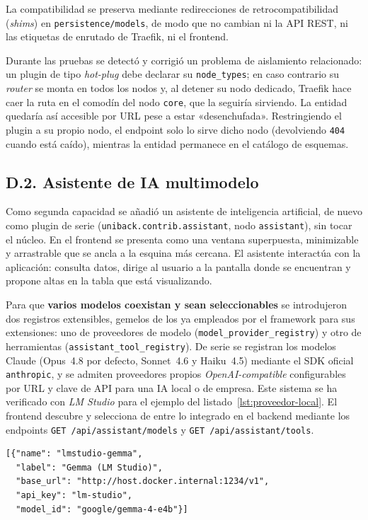 La compatibilidad se preserva mediante redirecciones de retrocompatibilidad
(\emph{shims}) en \texttt{persistence/models}, de modo que no cambian ni la API
REST, ni las etiquetas de enrutado de Traefik, ni el frontend.

Durante las pruebas se detectó y corrigió un problema de aislamiento
relacionado: un plugin de tipo \emph{hot-plug} debe declarar su
\texttt{node\_types}; en caso contrario su \emph{router} se monta en todos los
nodos y, al detener su nodo dedicado, Traefik hace caer la ruta en el comodín
del nodo \texttt{core}, que la seguiría sirviendo. La entidad quedaría así
accesible por URL pese a estar «desenchufada». Restringiendo el plugin a su
propio nodo, el endpoint solo lo sirve dicho nodo (devolviendo \texttt{404}
cuando está caído), mientras la entidad permanece en el catálogo de esquemas.

\subsection{D.2. Asistente de IA multimodelo}
\label{anexo:ia}
Como segunda capacidad se añadió un asistente de inteligencia artificial, de
nuevo como plugin de serie (\texttt{uniback.contrib.assistant}, nodo
\texttt{assistant}), sin tocar el núcleo. En el frontend se presenta como una
ventana superpuesta, minimizable y arrastrable que se ancla a la esquina más
cercana. El asistente interactúa con la aplicación: consulta datos, dirige al
usuario a la pantalla donde se encuentran y propone altas en la tabla que está
visualizando.

Para que \textbf{varios modelos coexistan y sean seleccionables} se
introdujeron dos registros extensibles, gemelos de los ya empleados por el
framework para sus extensiones: uno de proveedores de modelo
(\texttt{model\_provider\_registry}) y otro de herramientas
(\texttt{assistant\_\allowbreak tool\_registry}). De serie se registran los modelos Claude
(Opus~4.8 por defecto, Sonnet~4.6 y Haiku~4.5) mediante el SDK oficial
\texttt{anthropic}, y se admiten proveedores propios \emph{OpenAI-compatible}
configurables por URL y clave de API para una IA local o de empresa. Este sistema se ha 
verificado con \emph{LM Studio} para el ejemplo del
listado~\ref{lst:proveedor-local}. El frontend descubre y selecciona de entre
lo integrado en el backend mediante los endpoints
\texttt{GET /api/assistant/models} y \texttt{GET /api/assistant/tools}.

\begin{lstlisting}[caption={Proveedor de modelo local configurado por variable de entorno.}, label={lst:proveedor-local}]
[{"name": "lmstudio-gemma",
  "label": "Gemma (LM Studio)",
  "base_url": "http://host.docker.internal:1234/v1",
  "api_key": "lm-studio",
  "model_id": "google/gemma-4-e4b"}]
\end{lstlisting}

